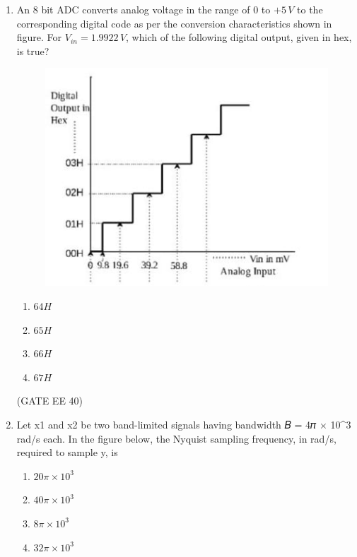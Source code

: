 \begin{enumerate}[label=\thechapter.\arabic*,ref=\thechapter.\theenumi]

\item An $8$ bit ADC converts analog voltage in the range of $0$ to $+5\, V$ to the corresponding digital code as per the conversion characteristics shown in figure. For $V_{in} = 1.9922\, V$, which of the following digital output, given in hex, is true?

\begin{figure}[!h]
    \centering
    \includegraphics[width=\columnwidth]{2023/EE/40/figs/fig1.jpeg}
    \caption{}
    \label{fig:ADC_gate.ee.23.40}
\end{figure}
\begin{enumerate}[label=(\alph*)]
    \item $64H$
    \item $65H$
    \item $66H$
    \item $67H$
\end{enumerate} \hfill(GATE EE 40)

\solution

\newpage
\item Let x1 and x2 be two band-limited signals having bandwidth 𝐵 = 4𝜋 × 10^3
rad/s each. In the figure below, the Nyquist sampling frequency, in
rad/s, required to sample y, is
  \\
 \begin{enumerate}[label=(\alph*)]
    \item $20\pi\times10^3$
    \item $40\pi\times10^3$
    \item $8\pi\times10^3$
    \item $32\pi\times10^3$
\end{enumerate}
\solution
\newpage
\end{enumerate}
